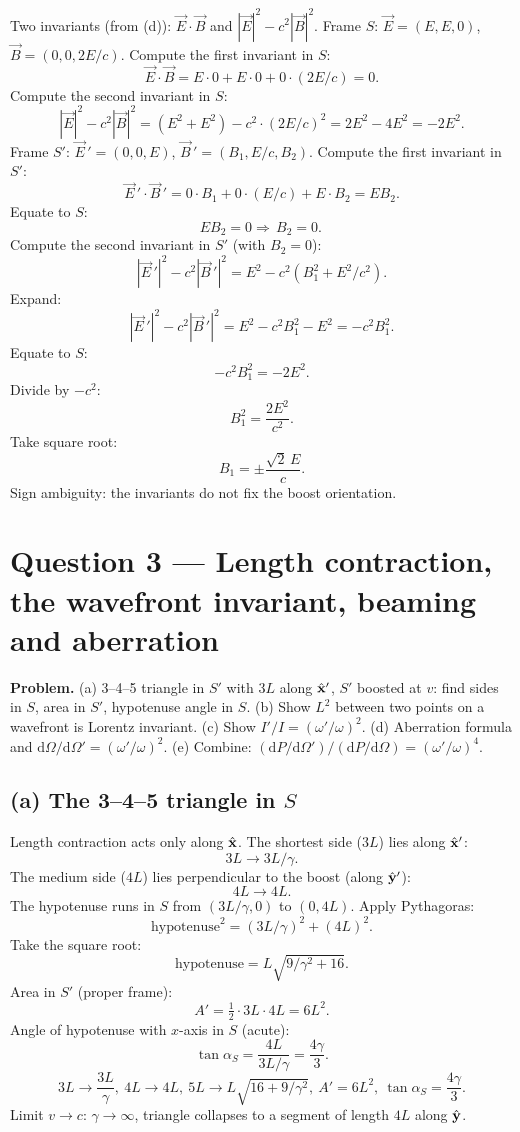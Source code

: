 \documentclass[11pt]{article}
\newcommand{\de}{\mathrm{d}}
\begin{document}
Two invariants (from (d)): $\vec E\cdot\vec B$ and $|\vec E|^2-c^2|\vec B|^2$.
Frame $S$: $\vec E=(E,E,0)$, $\vec B=(0,0,2E/c)$.
Compute the first invariant in $S$:
\[ \vec E\cdot\vec B=E\cdot 0+E\cdot 0+0\cdot(2E/c)=0. \]
Compute the second invariant in $S$:
\[ |\vec E|^2-c^2|\vec B|^2=(E^2+E^2)-c^2\cdot(2E/c)^2=2E^2-4E^2=-2E^2. \]
Frame $S'$: $\vec E\,'=(0,0,E)$, $\vec B\,'=(B_1,E/c,B_2)$.
Compute the first invariant in $S'$:
\[ \vec E\,'\cdot\vec B\,'=0\cdot B_1+0\cdot(E/c)+E\cdot B_2=EB_2. \]
Equate to $S$:
\[ EB_2=0\Rightarrow\boxed{\,B_2=0.\,} \]
Compute the second invariant in $S'$ (with $B_2=0$):
\[ |\vec E\,'|^2-c^2|\vec B\,'|^2=E^2-c^2(B_1^2+E^2/c^2). \]
Expand:
\[ |\vec E\,'|^2-c^2|\vec B\,'|^2=E^2-c^2B_1^2-E^2=-c^2B_1^2. \]
Equate to $S$:
\[ -c^2 B_1^2=-2E^2. \]
Divide by $-c^2$:
\[ B_1^2=\frac{2E^2}{c^2}. \]
Take square root:
\begin{equation}
\boxed{\,B_1=\pm\frac{\sqrt{2}\,E}{c}.\,}
\end{equation}
Sign ambiguity: the invariants do not fix the boost orientation.

\section*{Question 3 --- Length contraction, the wavefront invariant, beaming and aberration}

\textbf{Problem.} (a) 3--4--5 triangle in $S'$ with $3L$ along $\hat{\vb x}'$, $S'$ boosted at $v$: find sides in $S$, area in $S'$, hypotenuse angle in $S$. (b) Show $L^2$ between two points on a wavefront is Lorentz invariant. (c) Show $I'/I=(\omega'/\omega)^2$. (d) Aberration formula and $\de\Omega/\de\Omega'=(\omega'/\omega)^2$. (e) Combine: $(\de P/\de\Omega')/(\de P/\de\Omega)=(\omega'/\omega)^4$.

\subsection*{(a) The 3--4--5 triangle in $S$}

Length contraction acts only along $\hat{\vb x}$. The shortest side ($3L$) lies along $\hat{\vb x}'$:
\[ 3L\to 3L/\gamma. \]
The medium side ($4L$) lies perpendicular to the boost (along $\hat{\vb y}'$):
\[ 4L\to 4L. \]
The hypotenuse runs in $S$ from $(3L/\gamma,0)$ to $(0,4L)$. Apply Pythagoras:
\[ \text{hypotenuse}^2=(3L/\gamma)^2+(4L)^2. \]
Take the square root:
\[ \text{hypotenuse}=L\sqrt{9/\gamma^2+16}. \]
Area in $S'$ (proper frame):
\[ A'=\tfrac12\cdot 3L\cdot 4L=6L^2. \]
Angle of hypotenuse with $x$-axis in $S$ (acute):
\[ \tan\alpha_S=\frac{4L}{3L/\gamma}=\frac{4\gamma}{3}. \]
\begin{equation}
\boxed{\,3L\to\frac{3L}{\gamma},\ 4L\to 4L,\ 5L\to L\sqrt{16+9/\gamma^2},\ A'=6L^2,\ \tan\alpha_S=\frac{4\gamma}{3}.\,}
\end{equation}
Limit $v\to c$: $\gamma\to\infty$, triangle collapses to a segment of length $4L$ along $\hat{\vb y}$.
\end{document}
